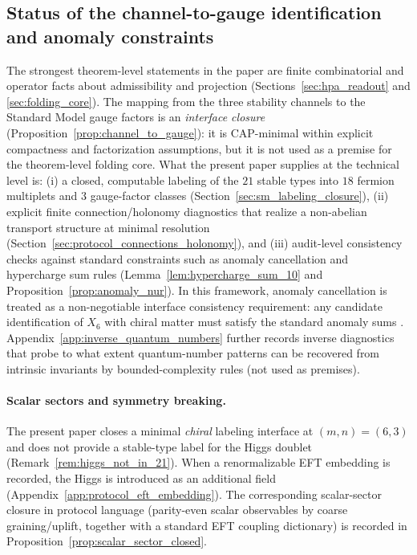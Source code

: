 \subsection{Status of the channel-to-gauge identification and anomaly constraints}
The strongest theorem-level statements in the paper are finite combinatorial and operator facts about admissibility and projection (Sections~\ref{sec:hpa_readout} and \ref{sec:folding_core}).
The mapping from the three stability channels to the Standard Model gauge factors is an \emph{interface closure} (Proposition~\ref{prop:channel_to_gauge}): it is CAP-minimal within explicit compactness and factorization assumptions, but it is not used as a premise for the theorem-level folding core.
What the present paper supplies at the technical level is:
(i) a closed, computable labeling of the $21$ stable types into $18$ fermion multiplets and $3$ gauge-factor classes (Section~\ref{sec:sm_labeling_closure}),
(ii) explicit finite connection/holonomy diagnostics that realize a non-abelian transport structure at minimal resolution (Section~\ref{sec:protocol_connections_holonomy}),
and (iii) audit-level consistency checks against standard constraints such as anomaly cancellation and hypercharge sum rules (Lemma~\ref{lem:hypercharge_sum_10} and Proposition~\ref{prop:anomaly_nur}).
In this framework, anomaly cancellation is treated as a non-negotiable interface consistency requirement: any candidate identification of $X_6$ with chiral matter must satisfy the standard anomaly sums \cite{PeskinSchroeder1995,PDGRPP2024}.
Appendix~\ref{app:inverse_quantum_numbers} further records inverse diagnostics that probe to what extent quantum-number patterns can be recovered from intrinsic invariants by bounded-complexity rules (not used as premises).

\paragraph{Scalar sectors and symmetry breaking.}
The present paper closes a minimal \emph{chiral} labeling interface at $(m,n)=(6,3)$ and does not provide a stable-type label for the Higgs doublet (Remark~\ref{rem:higgs_not_in_21}).
When a renormalizable EFT embedding is recorded, the Higgs is introduced as an additional field (Appendix~\ref{app:protocol_eft_embedding}).
The corresponding scalar-sector closure in protocol language (parity-even scalar observables by coarse graining/uplift, together with a standard EFT coupling dictionary) is recorded in Proposition~\ref{prop:scalar_sector_closed}.

